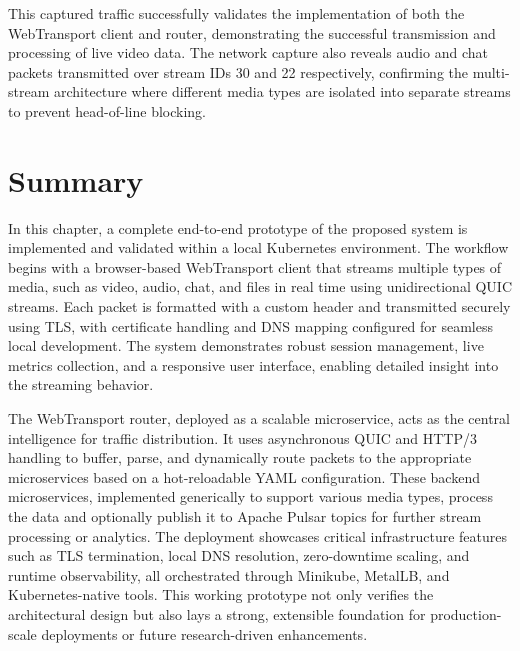 This captured traffic successfully validates the implementation of both the WebTransport client and router, demonstrating the successful transmission and processing of live video data. The network capture also reveals audio and chat packets transmitted over stream IDs 30 and 22 respectively, confirming the multi-stream architecture where different media types are isolated into separate streams to prevent head-of-line blocking.





\section{Summary}

In this chapter, a complete end-to-end prototype of the proposed system is implemented and validated within a local Kubernetes environment. The workflow begins with a browser-based WebTransport client that streams multiple types of media, such as video, audio, chat, and files in real time using unidirectional QUIC streams. Each packet is formatted with a custom header and transmitted securely using TLS, with certificate handling and DNS mapping configured for seamless local development. The system demonstrates robust session management, live metrics collection, and a responsive user interface, enabling detailed insight into the streaming behavior.

The WebTransport router, deployed as a scalable microservice, acts as the central intelligence for traffic distribution. It uses asynchronous QUIC and HTTP/3 handling to buffer, parse, and dynamically route packets to the appropriate microservices based on a hot-reloadable YAML configuration. These backend microservices, implemented generically to support various media types, process the data and optionally publish it to Apache Pulsar topics for further stream processing or analytics. The deployment showcases critical infrastructure features such as TLS termination, local DNS resolution, zero-downtime scaling, and runtime observability, all orchestrated through Minikube, MetalLB, and Kubernetes-native tools. This working prototype not only verifies the architectural design but also lays a strong, extensible foundation for production-scale deployments or future research-driven enhancements.